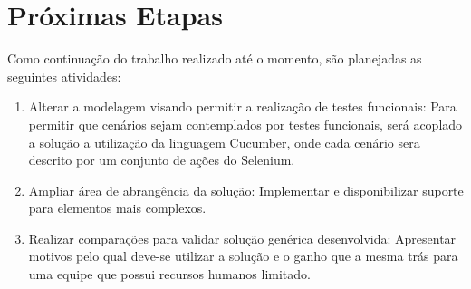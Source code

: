 \documentclass[tg]{mdtufsm}
\begin{document}
\chapter{Próximas Etapas}
Como continuação do trabalho realizado até o momento, são planejadas as seguintes atividades:

\begin{enumerate}
	\item Alterar a modelagem visando permitir a realização de testes funcionais: Para permitir que cenários sejam contemplados por testes funcionais, será
	acoplado a solução a utilização da linguagem Cucumber, onde cada cenário sera descrito por um conjunto de ações do Selenium.
	\item Ampliar área de abrangência da solução: Implementar e disponibilizar suporte para elementos mais complexos.
	\item Realizar comparações para validar solução genérica desenvolvida: Apresentar motivos pelo qual deve-se utilizar a solução e o ganho que a mesma trás para uma equipe que possui
	recursos humanos limitado.
\end{enumerate}

\setlength{\baselineskip}{\baselineskip}


\end{document}
